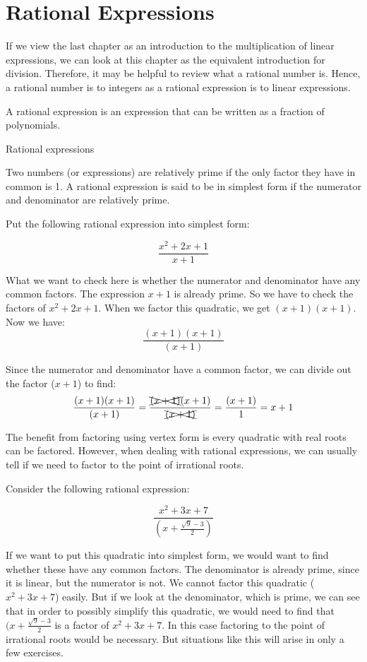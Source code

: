\chapter{Rational Expressions}

If we view the last chapter as an introduction to the multiplication of linear expressions, we can look at this chapter as the equivalent introduction for division. Therefore, it may be helpful to review what a rational number is. Hence, a rational number is to integers as a rational expression is to linear expressions.

\begin{defn}
	A rational expression is an expression that can be written as a fraction of polynomials. 
\end{defn}

Rational expressions 

\begin{defn}
	Two numbers (or expressions) are relatively prime if the only factor they have in common is 1. A rational expression is said to be in simplest form if the numerator and denominator are relatively prime. 
\end{defn}

\begin{example}
	Put the following rational expression into simplest form:
	
	\[
	\frac{x^2+2x+1}{x+1}
	\]
	
	What we want to check here is whether the numerator and denominator have any common factors. The expression $x+1$ is already prime. So we have to check the factors of $x^2+2x+1$. When we factor this quadratic, we get $(x+1)(x+1)$. Now we have:
	\[
	\frac{(x+1)(x+1)}{(x+1)}
	\]
	
	Since the numerator and denominator have a common factor, we can divide out the factor ($x+1$) to find:
	\[
	\frac{(x+1)(x+1)}{(x+1)}= \frac{\xcancel{(x+1)}(x+1)}{\xcancel{(x+1)}}=\frac{(x+1)}{1}=x+1
	\]
\end{example}


The benefit from factoring using vertex form is every quadratic with real roots can be factored. However, when dealing with rational expressions, we can usually tell if we need to factor to the point of irrational roots. 

\begin{example}
Consider the following rational expression:

\[
\frac{x^2+3x+7}{(x+\frac{\sqrt{9}-3}{2})}
\]

If we want to put this quadratic into simplest form, we would want to find whether these have any common factors. The denominator is already prime, since it is linear, but the numerator is not. We cannot factor this quadratic ($x^2+3x+7$) easily. But if we look at the denominator, which is prime, we can see that in order to possibly simplify this quadratic, we would need to find that $(x+\frac{\sqrt{9}-3}{2}$ is a factor of $x^2+3x+7$. In this case factoring to the point of irrational roots would be necessary. But situations like this will arise in only a few exercises. 
\end{example}


